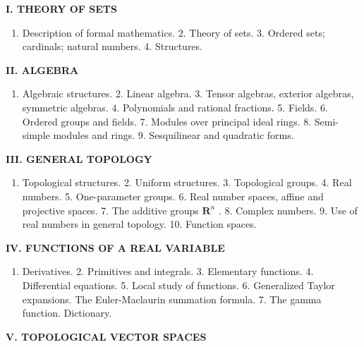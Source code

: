 
\textbf{I. THEORY OF SETS}\par

\begin{enumerate}
\def\labelenumi{\arabic{enumi}.}
\tightlist
\item
  Description of formal mathematics. 2. Theory of sets. 3. Ordered sets; cardinals; natural numbers. 4. Structures.
\end{enumerate}

\textbf{II. ALGEBRA}\par

\begin{enumerate}
\def\labelenumi{\arabic{enumi}.}
\tightlist
\item
  Algebraic structures. 2. Linear algebra. 3. Tensor algebras, exterior algebras, symmetric algebras. 4. Polynomials and rational fractions. 5. Fields. 6. Ordered groups and fields. 7. Modules over principal ideal rings. 8. Semi-simple modules and rings. 9. Sesquilinear and quadratic forms.
\end{enumerate}

\textbf{III. GENERAL TOPOLOGY}\par

\begin{enumerate}
\def\labelenumi{\arabic{enumi}.}
\tightlist
\item
  Topological structures. 2. Uniform structures. 3. Topological groups. 4. Real numbers. 5. One-parameter groups. 6. Real number spaces, affine and projective spaces. 7. The additive groups \(\mathbf{R}^n\) . 8. Complex numbers. 9. Use of real numbers in general topology. 10. Function spaces.
\end{enumerate}

\textbf{IV. FUNCTIONS OF A REAL VARIABLE}\par

\begin{enumerate}
\def\labelenumi{\arabic{enumi}.}
\tightlist
\item
  Derivatives. 2. Primitives and integrals. 3. Elementary functions. 4. Differential equations. 5. Local study of functions. 6. Generalized Taylor expansions. The Euler-Maclaurin summation formula. 7. The gamma function. Dictionary.
\end{enumerate}

\textbf{V. TOPOLOGICAL VECTOR SPACES}\par

